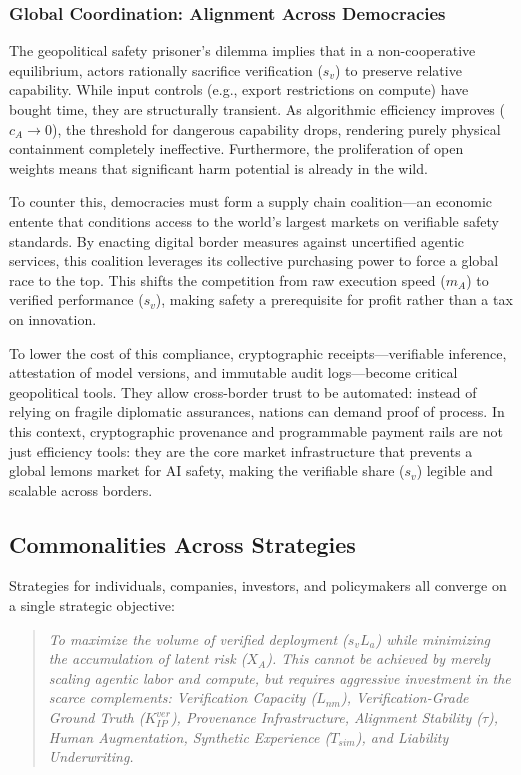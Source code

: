 \documentclass[12pt, letter]{article}
\begin{document}
\subsubsection{Global Coordination: Alignment Across Democracies}

The geopolitical safety prisoner's dilemma implies that in a non-cooperative equilibrium, actors rationally sacrifice verification ($s_v$) to preserve relative capability. While input controls (e.g., export restrictions on compute) have bought time, they are structurally transient. As algorithmic efficiency improves ($c_A \to 0$), the threshold for dangerous capability drops, rendering purely physical containment completely ineffective. Furthermore, the proliferation of open weights means that significant harm potential is already in the wild. 

To counter this, democracies must form a supply chain coalition—an economic entente that conditions access to the world's largest markets on verifiable safety standards. By enacting digital border measures against uncertified agentic services, this coalition leverages its collective purchasing power to force a global race to the top. This shifts the competition from raw execution speed ($m_A$) to verified performance ($s_v$), making safety a prerequisite for profit rather than a tax on innovation.

To lower the cost of this compliance, cryptographic receipts—verifiable inference, attestation of model versions, and immutable audit logs—become critical geopolitical tools. They allow cross-border trust to be automated: instead of relying on fragile diplomatic assurances, nations can demand proof of process. In this context, cryptographic provenance and programmable payment rails are not just efficiency tools: they are the core market infrastructure that prevents a global lemons market for AI safety, making the verifiable share ($s_v$) legible and scalable across borders.


\clearpage

\subsection{Commonalities Across Strategies}\label{subsec:synthesis}

Strategies for individuals, companies, investors, and policymakers all converge on a single strategic objective:

\begin{quote}
\emph{To maximize the volume of verified deployment ($s_v L_a$) while minimizing the accumulation of latent risk ($X_A$). This cannot be achieved by merely scaling agentic labor and compute, but requires aggressive investment in the scarce complements: Verification Capacity ($L_{nm}$), Verification-Grade Ground Truth ($K_{IP}^{ver}$), Provenance Infrastructure, Alignment Stability ($\tau$), Human Augmentation, Synthetic Experience ($T_{sim}$), and Liability Underwriting.}
\end{quote}
\end{document}
